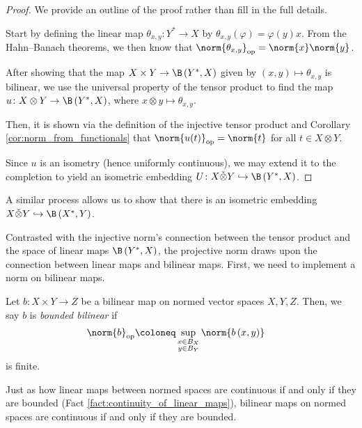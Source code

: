 \begin{proof}
  We provide an outline of the proof rather than fill in the full details.\newline

  Start by defining the linear map $\theta_{x,y}\colon Y^{\ast}\rightarrow X$ by $\theta_{x,y}\left( \varphi \right) = \varphi\left( y \right)x$. From the Hahn--Banach theorems, we then know that $\norm{\theta_{x,y}}_{\op} = \norm{x}\norm{y}$.\newline

  After showing that the map $X\times Y \rightarrow \B\left( Y^{\ast},X \right)$ given by $\left( x,y \right)\mapsto \theta_{x,y}$ is bilinear, we use the universal property of the tensor product to find the map $u\colon X\otimes Y \rightarrow \B\left( Y^{\ast},X \right)$, where $x\otimes y \mapsto \theta_{x,y}$.\newline

  Then, it is shown via the definition of the injective tensor product and Corollary \ref{cor:norm_from_functionals} that $\norm{u(t)}_{\op} = \norm{t}$ for all $t\in X\otimes Y$.\newline

  Since $u$ is an isometry (hence uniformly continuous), we may extend it to the completion to yield an isometric embedding $U\colon X\check\otimes Y \hookrightarrow \B\left( Y^{\ast},X \right)$.
\end{proof}
\begin{remark}
  A similar process allows us to show that there is an isometric embedding $X\check\otimes Y \hookrightarrow \B\left( X^{\ast},Y \right)$.
\end{remark}
Contrasted with the injective norm's connection between the tensor product and the space of linear maps $\B\left( Y^{\ast},X \right)$, the projective norm draws upon the connection between linear maps and bilinear maps. First, we need to implement a norm on bilinear maps.
\begin{definition}
  Let $b\colon X\times Y \rightarrow Z$ be a bilinear map on normed vector spaces $X,Y,Z$. Then, we say $b$ is \textit{bounded bilinear} if
  \begin{align*}
    \norm{b}_{\op} &\coloneq \sup_{\substack{x\in B_{X}\\y\in B_{Y}}}\norm{b\left( x,y \right)}
  \end{align*}
  is finite.
\end{definition}
Just as how linear maps between normed spaces are continuous if and only if they are bounded (Fact \ref{fact:continuity_of_linear_maps}), bilinear maps on normed spaces are continuous if and only if they are bounded.\newline

